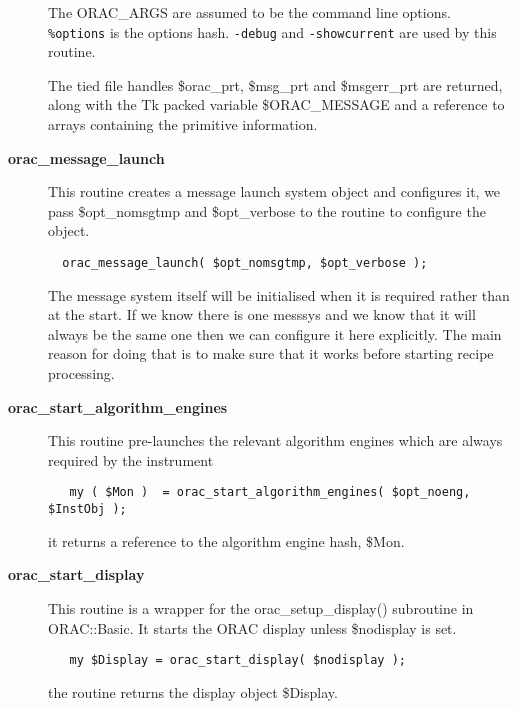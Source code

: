 \begin{description}
The ORAC\_ARGS are assumed to be the command line options. \texttt{\%options}
is the options hash. \texttt{-debug} and \texttt{-showcurrent} are used by this
routine.



The tied file handles \$orac\_prt, \$msg\_prt and \$msgerr\_prt are
returned, along with the Tk packed variable \$ORAC\_MESSAGE and
a reference to arrays containing the primitive information.


\item[{\textbf{orac\_message\_launch}}] \mbox{}

This routine creates a message launch system object and configures it,
we pass \$opt\_nomsgtmp and \$opt\_verbose to the routine to configure the
object.

\begin{verbatim}
  orac_message_launch( $opt_nomsgtmp, $opt_verbose );
\end{verbatim}


The message system itself will be initialised when it is required 
rather than at the start. If we know there is one messsys and we 
know that it will always be the same one then we can configure it here explicitly. The main reason for doing that is to make sure that it 
works before starting recipe processing.


\item[{\textbf{orac\_start\_algorithm\_engines}}] \mbox{}

This routine pre-launches the relevant algorithm engines which are always required by the instrument

\begin{verbatim}
   my ( $Mon )  = orac_start_algorithm_engines( $opt_noeng, $InstObj );
\end{verbatim}


it returns a reference to the algorithm engine hash, \$Mon.


\item[{\textbf{orac\_start\_display}}] \mbox{}

This routine is a wrapper for the orac\_setup\_display() subroutine in 
ORAC::Basic. It starts the ORAC display unless \$nodisplay is
set.

\begin{verbatim}
   my $Display = orac_start_display( $nodisplay );
\end{verbatim}


the routine returns the display object \$Display.




\end{description}
